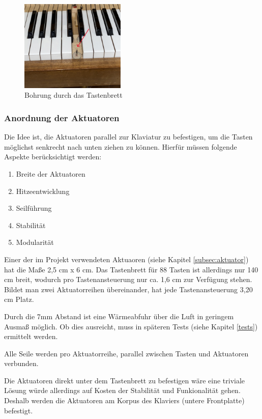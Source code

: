 \begin{figure}[htbp]
	\centering
	\includegraphics[width=5cm]{img/Klaviatur.jpg}
	\caption{Bohrung durch das Tastenbrett}
	\label{fig:klaviatur}
\end{figure}

\subsubsection{Anordnung der Aktuatoren}

Die Idee ist, die Aktuatoren parallel zur Klaviatur zu befestigen, um die Tasten möglichst senkrecht nach unten ziehen zu können.
Hierfür müssen folgende Aspekte berücksichtigt werden:

\begin{enumerate}
	\item Breite der Aktuatoren
	\item Hitzeentwicklung
	\item Seilführung
	\item Stabilität
	\item Modularität
\end{enumerate}

Einer der im Projekt verwendeten Aktuaoren (siehe Kapitel \ref{subsec:aktuator}) hat die Maße 2,5 cm x 6 cm.
Das Tastenbrett für 88 Tasten ist allerdings nur 140 cm breit, wodurch pro Tastenansteuerung nur ca. 1,6 cm zur Verfügung stehen.
Bildet man zwei Aktuatorreihen übereinander, hat jede Tastenansteuerung 3,20 cm Platz.

Durch die 7mm Abstand ist eine Wärmeabfuhr über die Luft in geringem Ausmaß möglich.
Ob dies ausreicht, muss in späteren Tests (siehe Kapitel \ref{tests}) ermittelt werden.

Alle Seile werden pro Aktuatorreihe, parallel zwischen Tasten und Aktuatoren verbunden.

Die Aktuatoren direkt unter dem Tastenbrett zu befestigen wäre eine triviale Lösung würde allerdings auf Kosten der Stabilität und Funkionalität gehen. %
Deshalb werden die Aktuatoren am Korpus des Klaviers (untere Frontplatte) befestigt.

